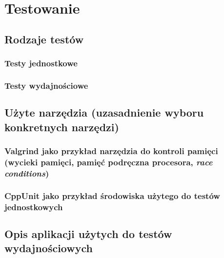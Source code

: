 \section{Testowanie}

\subsection{Rodzaje testów}

\subsubsection{Testy jednostkowe}

\subsubsection{Testy wydajnościowe}

\subsection{Użyte narzędzia (uzasadnienie wyboru konkretnych narzędzi)}

\subsubsection{Valgrind jako przykład narzędzia do kontroli pamięci
							 (wycieki pamięci, pamięć podręczna procesora, 
							 \emph{race conditions})}

\subsubsection{CppUnit jako przykład środowiska użytego do testów jednostkowych}

\subsection{Opis aplikacji użytych do testów wydajnościowych}

